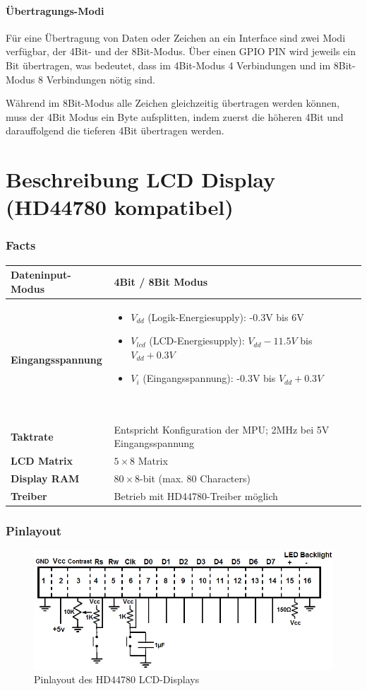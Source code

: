 \documentclass[a4paper,11pt]{article}
\begin{document}
\subsection*{Übertragungs-Modi}
Für eine Übertragung von Daten oder Zeichen an ein Interface sind zwei Modi verfügbar, der 4Bit- und der 8Bit-Modus. Über einen GPIO PIN wird jeweils ein Bit übertragen, was bedeutet, dass im 4Bit-Modus 4 Verbindungen und im 8Bit-Modus 8 Verbindungen nötig sind.\par
Während im 8Bit-Modus alle Zeichen gleichzeitig übertragen werden können, muss der 4Bit Modus ein Byte aufsplitten, indem zuerst die höheren 4Bit und darauffolgend die tieferen 4Bit übertragen werden.
\newpage
\part{Beschreibung LCD Display (HD44780 kompatibel)}
\section*{Facts}
\begin{tabular}{| p{3.5cm} | p{10cm} |}
	\hline
	\textbf{Dateninput-Modus} & 4Bit / 8Bit Modus\\\hline
	\textbf{Eingangsspannung} & 
	\begin{itemize}
		\item $V_{dd}$ (Logik-Energiesupply): -0.3V bis 6V
		\item $V_{lcd}$ (LCD-Energiesupply): $V_{dd}-11.5V$ bis $V_{dd}+0.3V$
		\item $V_{i}$ (Eingangsspannung): -0.3V bis $V_{dd} + 0.3V$
	\end{itemize}~
	\\\hline
	\textbf{Taktrate} & Entspricht Konfiguration der MPU; 2MHz bei 5V Eingangsspannung\\\hline
	\textbf{LCD Matrix} & $5 \times 8$ Matrix\\\hline
	\textbf{Display RAM} & $80 \times 8$-bit (max. 80 Characters)\\\hline
	\textbf{Treiber} & Betrieb mit HD44780-Treiber möglich\\\hline
\end{tabular}

\section*{Pinlayout}
\begin{figure}[h!t]
	\includegraphics[width=\textwidth]{./images/pinlayout_hd44780.png}
	\caption{Pinlayout des HD44780 LCD-Displays}
\end{figure}
\end{document}
